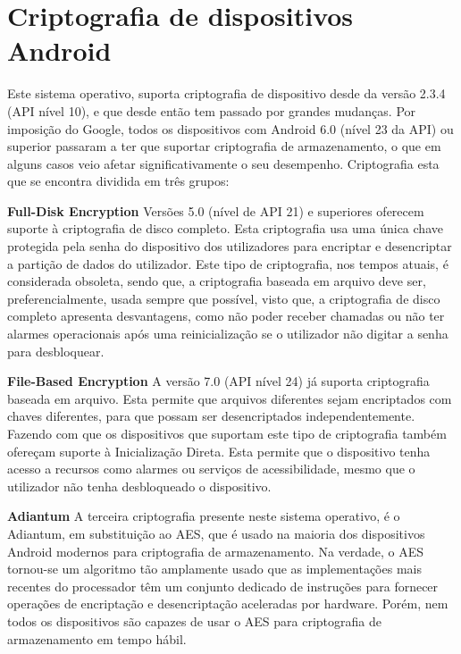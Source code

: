 \section{Criptografia de dispositivos Android}
Este sistema operativo, suporta criptografia de dispositivo desde da versão 2.3.4 (API nível 10), e que desde então tem passado por grandes mudanças. Por imposição do Google, todos os dispositivos com Android 6.0 (nível 23 da API) ou superior passaram a ter que suportar criptografia de armazenamento, o que em alguns casos veio afetar significativamente o seu desempenho. Criptografia esta que se encontra dividida em três grupos: 
\\
\par \textbf{Full-Disk Encryption} 
Versões 5.0 (nível de API 21) e superiores oferecem suporte à criptografia de disco completo. Esta criptografia usa uma única chave protegida pela senha do dispositivo dos utilizadores para encriptar e desencriptar a partição de dados do utilizador. Este tipo de criptografia, nos tempos atuais, é considerada obsoleta, sendo que, a criptografia baseada em arquivo deve ser, preferencialmente, usada sempre que possível, visto que, a criptografia de disco completo apresenta desvantagens, como não poder receber chamadas ou não ter alarmes operacionais após uma reinicialização se o utilizador não digitar a senha para desbloquear.
\\
\par \textbf{File-Based Encryption}
A versão 7.0 (API nível 24) já suporta criptografia baseada em arquivo. Esta permite que arquivos diferentes sejam encriptados com chaves diferentes, para que possam ser desencriptados independentemente. Fazendo com que os dispositivos que suportam este tipo de criptografia também ofereçam suporte à Inicialização Direta. Esta permite que o dispositivo tenha acesso a recursos como alarmes ou serviços de acessibilidade, mesmo que o utilizador não tenha desbloqueado o dispositivo.
\\
\par \textbf{Adiantum}
A terceira criptografia presente neste sistema operativo, é o Adiantum, em substituição ao AES, que é usado na maioria dos dispositivos Android modernos para criptografia de armazenamento. Na verdade, o AES tornou-se um algoritmo tão amplamente usado que as implementações mais recentes do processador têm um conjunto dedicado de instruções para fornecer operações de encriptação e desencriptação aceleradas por hardware. Porém, nem todos os dispositivos são capazes de usar o AES para criptografia de armazenamento em tempo hábil. 
